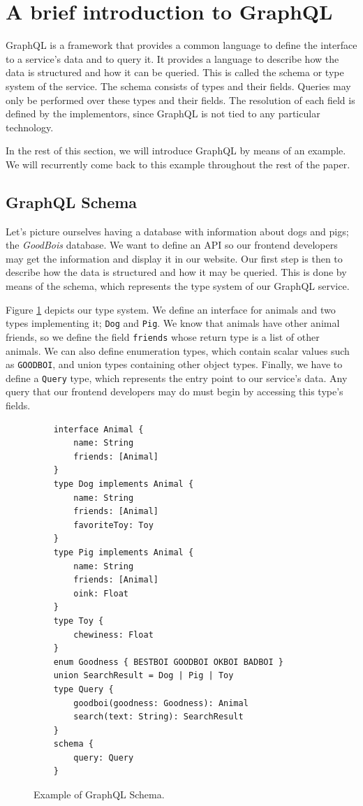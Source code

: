 
\section{A brief introduction to GraphQL}\label{sec:bg}

GraphQL is a framework that provides a common language to define the interface to a service's data and to query it.
It provides a language to describe how the data is structured and how it can be queried. This is called the schema or type system of the service. The schema consists of types and their fields. Queries may only be performed over these types and their fields. The resolution of each field is defined by the implementors, since GraphQL is not tied to any particular technology.

In the rest of this section, we will introduce GraphQL by means of an example. We will recurrently come back to this example throughout the rest of the paper.

\subsection*{GraphQL Schema}

Let's picture ourselves having a database with information about dogs and pigs; the \textit{GoodBois} database. We want to define an API so our frontend developers may get the information and display it in our website. Our first step is then to describe how the data is structured and how it may be queried. This is done by means of the schema, which represents the type system of our GraphQL service.

Figure \ref{fig:schema_ex} depicts our type system. We define an interface for animals and two types implementing it; \texttt{Dog} and \texttt{Pig}. We know that animals have other animal friends, so we define the field \texttt{friends} whose return type is a list of other animals. We can also define enumeration types, which contain scalar values such as \texttt{GOODBOI}, and union types containing other object types. Finally, we have to define a \texttt{Query} type, which represents the entry point to our service's data. Any query that our frontend developers may do must begin by accessing this type's fields.

\begin{figure}
    \centering
    \begin{verbatim}
    interface Animal {
        name: String
        friends: [Animal]
    }
    type Dog implements Animal {
        name: String
        friends: [Animal]
        favoriteToy: Toy
    }
    type Pig implements Animal {
        name: String
        friends: [Animal]
        oink: Float
    }
    type Toy {
        chewiness: Float
    }
    enum Goodness { BESTBOI GOODBOI OKBOI BADBOI }
    union SearchResult = Dog | Pig | Toy
    type Query {
        goodboi(goodness: Goodness): Animal
        search(text: String): SearchResult
    }
    schema {
        query: Query
    }
    \end{verbatim}
    \caption{Example of GraphQL Schema.}
    \label{fig:schema_ex}
\end{figure}

